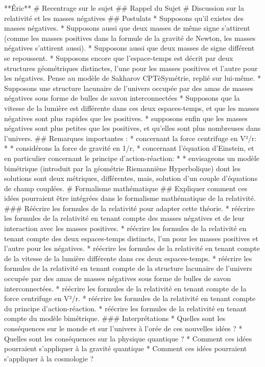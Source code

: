                          **Éric**
                         # Recentrage sur le sujet
                         ## Rappel du Sujet
                         # Discussion sur la relativité et les masses négatives
        ## Postulats
        * Supposons qu'il existes des masses négatives. 
        * Supposons aussi que deux masses de même signe s'attirent (comme les masses positives dans la formule de la gravité de Newton, les masses négatives s'attirent aussi). 
        * Supposons aussi que deux masses de signe différent se repoussent. 
        * Supposons encore que l'espace-temps est décrit par deux structures géométriques distinctes, l'une pour les masses positives et l'autre pour les négatives. 
            Pense au modèle de Sakharov CPTèSymétrie, replié sur lui-même.
        * Supposons une structure lacunaire de l’univers occupée par des amas de masses négatives sous forme de bulles de savon interconnectées
        * Supposons que la vitesse de la lumière est différente dans ces deux espaces-temps, et que les masses négatives sont plus rapides que les positives.
        * supposons enfin que les masses négatives sont plus petites que les positives, et qu'elles sont plus nombreuses dans l'univers.   
        ## Remarques importantes :
        * concernant la force centrifuge en V²/r:
        * * considérons la force de gravité en 1/r,
        * concernant l'équation d'Einstein, et en particulier concernant le principe d'action-réaction:
        * * envisageons un modèle bimétrique (introduit par la géométrie Riemanniène Hyperbolique) dont les solutions sont deux métriques, différentes, mais, solution d'un couple d'équations de champ couplées.
# Formalisme mathématique
        ## Expliquer comment ces idées pourraient être intégrées dans le formalisme mathématique de la relativité.
        ### Réécrire les formules de la relativité pour adapter cette théorie.
        * réécrire les formules de la relativité en tenant compte des masses négatives et de leur interaction avec les masses positives.
        * réécrire les formules de la relativité en tenant compte des deux espaces-temps distincts, l'un pour les masses positives et l'autre pour les négatives.
        * réécrire les formules de la relativité en tenant compte de la vitesse de la lumière différente dans ces deux espaces-temps.
        * réécrire les formules de la relativité en tenant compte de la structure lacunaire de l'univers occupée par des amas de masses négatives sous forme de bulles de savon interconnectées.
        * réécrire les formules de la relativité en tenant compte de la force centrifuge en V²/r.
        * réécrire les formules de la relativité en tenant compte du principe d'action-réaction.
        * réécrire les formules de la relativité en tenant compte du modèle bimétrique.
        ### Interprétations
        * Quelles sont les conséquences sur le monde et sur l'univers à l'orée de ces nouvelles idées ?
        * Quelles sont les conséquences sur la physique quantique ?
        * Comment ces idées pourraient s'appliquer à la gravité quantique
        * Comment ces idées pourraient s'appliquer à la cosmologie ?


